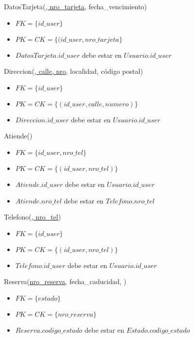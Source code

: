 \vspace*{0.5cm}
\noindent
DatosTarjeta(\underline{, nro\_tarjeta}, fecha\_vencimiento)
\begin{itemize}
	\item $FK = \{id\_user\}$
	\item $PK = CK = \{(id\_user, nro\_tarjeta\}$
	\item $DatosTarjeta.id\_user$ debe estar en $Usuario.id\_user$
\end{itemize}


\vspace*{0.5cm}
\noindent
Direccion(\underline{, calle, nro}, localidad,
					código postal)
\begin{itemize}
	\item $FK = \{id\_user\}$
	\item $PK = CK = \{(id\_user, calle, numero)\}$
	\item $Direccion.id\_user$ debe estar en $Usuario.id\_user$
\end{itemize}

\vspace*{0.5cm}
\noindent
Atiende(\underline{})
\begin{itemize}
	\item $FK = \{id\_user, nro\_tel\}$
	\item $PK = CK = \{(id\_user, nro\_tel)\}$
	\item $Atiende.id\_user$ debe estar en $Usuario.id\_user$
	\item $Atiende.nro\_tel$ debe estar en $Telefono.nro\_tel$
\end{itemize}

\vspace*{0.5cm}
\noindent
Telefono(\underline{, nro\_tel})
\begin{itemize}
	\item $FK = \{id\_user\}$
	\item $PK = CK = \{(id\_user, nro\_tel)\}$
	\item $Telefono.id\_user$ debe estar en $Usuario.id\_user$
\end{itemize}


\vspace*{0.5cm}
\noindent
Reserva(\underline{nro\_reserva}, fecha\_caducidad, )
\begin{itemize}
	\item $FK = \{estado\}$
	\item $PK = CK = \{nro\_reserva\}$
	\item $Reserva.codigo\_estado$ debe estar en $Estado.codigo\_estado$
\end{itemize}

